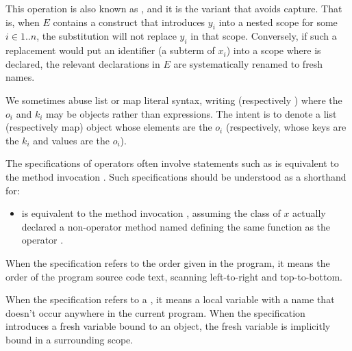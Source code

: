 \documentclass[makeidx]{article}
\begin{document}
\LMHash{}%
This operation is also known as ,
and it is the variant that avoids capture.
That is, when $E$ contains a construct that introduces $y_i$ into
a nested scope for some $i \in 1 .. n$,
the substitution will not replace $y_i$ in that scope.
Conversely, if such a replacement would put an identifier \id{}
(a subterm of $x_i$) into a scope where \id{} is declared,
the relevant declarations in $E$ are systematically renamed to fresh names.


\LMHash{}%
We sometimes abuse list or map literal syntax, writing \code{[\List{o}{1}{n}]}
(respectively )
where the $o_i$ and $k_i$ may be objects rather than expressions.
The intent is to denote a list (respectively map) object
whose elements are the $o_i$
(respectively, whose keys are the $k_i$ and values are the $o_i$).

\LMHash{}%
%
The specifications of operators often involve statements such as
 is equivalent to the method invocation
.
Such specifications should be understood as a shorthand for:
\begin{itemize}
\item
   is equivalent to the method invocation
  ,
  assuming the class of $x$
  actually declared a non-operator method named 
  defining the same function as the operator \op.
\end{itemize}


\LMHash{}%
When the specification refers to the order given in the program,
it means the order of the program source code text,
scanning left-to-right and top-to-bottom.

\LMHash{}%
When the specification refers to a
,
it means a local variable with a name that doesn't occur anywhere
in the current program.
When the specification introduces a fresh variable bound to an object,
the fresh variable is implicitly bound in a surrounding scope.
\end{document}
